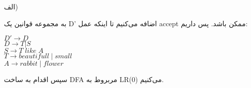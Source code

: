 

الف)

به مجموعه قوانین یک D' اضافه می‌کنیم تا اینکه عمل accept ممکن باشد. پس داریم:

\begin{center}
\begin{latin}
$D' \rightarrow D$
\\
$D \rightarrow T | S$
\\
$S \rightarrow T \; like \;A$
\\
$T \rightarrow beautifull \; | \; small$
\\
$A \rightarrow rabbit \;| \;flower$
\end{latin}
\end{center}

سپس اقدام به ساخت DFA مربروط به LR(0) می‌کنیم.

